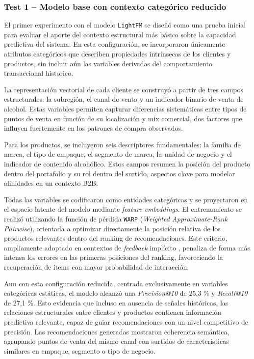 \subsubsection{Test 1 – Modelo base con contexto categórico reducido}

El primer experimento con el modelo \texttt{LightFM} se diseñó como una prueba inicial para evaluar el aporte del contexto estructural más básico sobre la capacidad predictiva del sistema. En esta configuración, se incorporaron únicamente atributos categóricos que describen propiedades intrínsecas de los clientes y productos, sin incluir aún las variables derivadas del comportamiento transaccional historico.

La representación vectorial de cada cliente se construyó a partir de tres campos estructurales: la subregión, el canal de venta y un indicador binario de venta de alcohol. Estas variables permiten capturar diferencias sistemáticas entre tipos de puntos de venta en función de su localización y mix comercial, dos factores que influyen fuertemente en los patrones de compra observados.

Para los productos, se incluyeron seis descriptores fundamentales: la familia de marca, el tipo de empaque, el segmento de marca, la unidad de negocio y el indicador de contenido alcohólico. Estos campos resumen la posición del producto dentro del portafolio y su rol dentro del surtido, aspectos clave para modelar afinidades en un contexto B2B.

Todas las variables se codificaron como entidades categóricas y se proyectaron en el espacio latente del modelo mediante \textit{feature embeddings}. El entrenamiento se realizó utilizando la función de pérdida \texttt{WARP} (\textit{Weighted Approximate-Rank Pairwise}), orientada a optimizar directamente la posición relativa de los productos relevantes dentro del ranking de recomendaciones. Este criterio, ampliamente adoptado en contextos de \textit{feedback} implícito \cite{ARTICLE:Rendle2009}, penaliza de forma más intensa los errores en las primeras posiciones del ranking, favoreciendo la recuperación de ítems con mayor probabilidad de interacción.

Aun con esta configuración reducida, centrada exclusivamente en variables categóricas estáticas, el modelo alcanzó una \textit{Precision@10} de 25{,}3 \% y \textit{Recall@10} de 27{,}1 \%. Esto evidencia que incluso en ausencia de señales históricas, las relaciones estructurales entre clientes y productos contienen información predictiva relevante, capaz de guiar recomendaciones con un nivel competitivo de precisión. Las recomendaciones generadas mostraron coherencia semántica, agrupando puntos de venta del mismo canal con surtidos de características similares en empaque, segmento o tipo de negocio.

